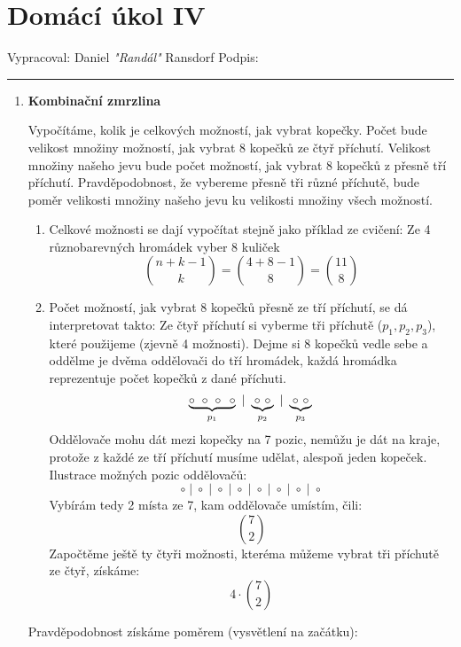 \documentclass[12pt]{article}
\begin{document}
\section*{Domácí úkol IV}

Vypracoval: Daniel \textit{"Randál"} Ransdorf \hfill Podpis: \rule{4cm}{0.4pt}

\begin{enumerate}
  \item \textbf{Kombinační zmrzlina}

    Vypočítáme, kolik je celkových možností, jak vybrat kopečky. Počet bude velikost množiny možností,
    jak vybrat 8 kopečků ze čtyř příchutí.
    Velikost množiny našeho jevu bude počet možností, jak vybrat 8 kopečků z přesně tří příchutí.
    Pravděpodobnost, že vybereme přesně tři různé příchutě, bude poměr velikosti množiny našeho jevu
    ku velikosti množiny všech možností.

    \begin{enumerate}
      \item Celkové možnosti se dají vypočítat stejně jako příklad ze cvičení: Ze 4 různobarevných hromádek vyber 8 kuliček
        \[
        \binom{n+k-1}{k} = \binom{4+8-1}{8} = \binom{11}{8}
        \]
      \item Počet možností, jak vybrat 8 kopečků přesně ze tří příchutí, se dá interpretovat takto:
        Ze čtyř příchutí si vyberme tři příchutě ($p_1, p_2, p_3$), které použijeme (zjevně 4 možnosti).
        Dejme si 8 kopečků vedle sebe a oddělme je dvěma oddělovači do tří hromádek,
        každá hromádka reprezentuje počet kopečků z dané příchuti.
        \[
          \underbrace{\circ\ \circ\ \circ\ \ \circ}_{p_1}\ |\ \underbrace{\circ\ \circ}_{p_2}\ |\ \underbrace{\circ\ \circ}_{p_3} \\
        \]
        Oddělovače mohu dát mezi kopečky na 7 pozic, nemůžu je dát na kraje,
        protože z každé ze tří příchutí musíme udělat, alespoň jeden kopeček.
        Ilustrace možných pozic oddělovačů:
        \[
        \circ \;|\; \circ \;|\; \circ \;|\; \circ \;|\; \circ \;|\; \circ \;|\; \circ \;|\; \circ
        \]
        Vybírám tedy 2 místa ze 7, kam oddělovače umístím, čili:
        \[ \binom{7}{2} \]
        Započtěme ještě ty čtyři možnosti, kteréma můžeme vybrat tři příchutě ze čtyř, získáme:
        \[ 4 \cdot \binom{7}{2} \]

      \end{enumerate}
    
      Pravděpodobnost získáme poměrem (vysvětlení na začátku):


\end{enumerate}
\end{document}
